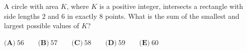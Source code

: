 A circle with area $K$, where $K$ is a positive integer, intersects a rectangle with side lengths $2$ and $6$ in exactly $8$ points. What is the sum of the smallest and largest possible values of $K$?

$\textbf{(A)}\ 56\qquad\textbf{(B)}\ 57\qquad\textbf{(C)}\ 58\qquad\textbf{(D)}\ 59\qquad\textbf{(E)}\ 60$

